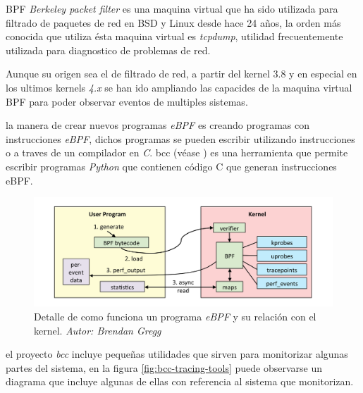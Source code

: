 BPF \emph{Berkeley packet filter} es una maquina virtual que ha sido utilizada para filtrado de paquetes de red en BSD y Linux desde hace 24 años, la orden
más conocida que utiliza ésta maquina virtual es \emph{tcpdump}, utilidad frecuentemente utilizada para diagnostico de problemas de red.

Aunque su origen sea el de filtrado de red, a partir del kernel 3.8 y en especial en los ultimos kernels \emph{4.x} se han ido ampliando las capacides de la maquina virtual BPF para poder
observar eventos de multiples sistemas.

la manera de crear nuevos programas \emph{eBPF} es creando programas con instrucciones \emph{eBPF}, dichos programas se pueden escribir utilizando
instrucciones o a traves de un compilador en \emph{C}. bcc (véase \cite{bcc-project}) es una herramienta que permite escribir programas \emph{Python} que contienen código C que generan 
instrucciones eBPF.

\begin{figure}[h]
  \centering
    \includegraphics[scale=0.3]{images/linux_ebpf_internals}
  \caption{Detalle de como funciona un programa \emph{eBPF} y su relación con el kernel. \emph{Autor: Brendan Gregg}}
  \label{fig:ebpf-internals}
\end{figure}

el proyecto \emph{bcc} incluye pequeñas utilidades que sirven para monitorizar algunas partes del sistema, en la figura \ref{fig:bcc-tracing-tools} puede observarse un diagrama que incluye algunas de ellas
con referencia al sistema que monitorizan.

